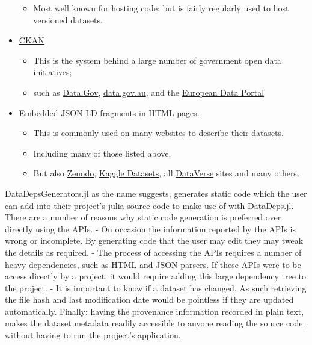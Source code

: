 \documentclass{book}
\begin{document}
\begin{itemize}[noitemsep,topsep=0pt]
	\begin{itemize}
		
		\item
		Most well known for hosting code; but is fairly regularly used to
		host versioned datasets.
	\end{itemize}
	\item
	\href{http://ckan.org/}{CKAN}
	
	\begin{itemize}
		
		\item
		This is the system behind a large number of government open data
		initiatives;
		\item
		such as \href{https://data.gov}{Data.Gov},
		\href{https://data.gov.au/}{data.gov.au}, and the
		\href{https://www.europeandataportal.eu/}{European Data Portal}
	\end{itemize}
	\item
	Embedded JSON-LD fragments in HTML pages.
	
	\begin{itemize}
		
		\item
		This is commonly used on many websites to describe their datasets.
		\item
		Including many of those listed above.
		\item
		But also \href{https://zenodo.org/}{Zenodo},
		\href{https://www.kaggle.com/datasets}{Kaggle Datasets}, all
		\href{https://dataverse.org/}{DataVerse} sites and many others.
	\end{itemize}
\end{itemize}

DataDepsGenerators.jl as the name suggests, generates static code which
the user can add into their project's julia source code to make use of
with DataDeps.jl. There are a number of reasons why static code
generation is preferred over directly using the APIs. - On occasion the
information reported by the APIs is wrong or incomplete. By generating
code that the user may edit they may tweak the details as required. -
The process of accessing the APIs requires a number of heavy
dependencies, such as HTML and JSON parsers. If these APIs were to be
access directly by a project, it would require adding this large
dependency tree to the project. - It is important to know if a dataset
has changed. As such retrieving the file hash and last modification date
would be pointless if they are updated automatically. Finally: having
the provenance information recorded in plain text, makes the dataset
metadata readily accessible to anyone reading the source code; without
having to run the project's application.
\end{document}
